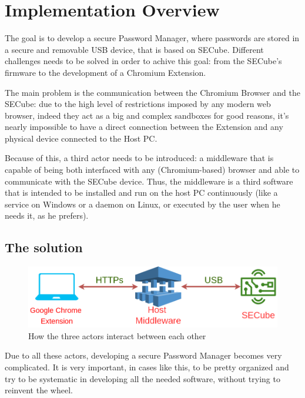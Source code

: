 \chapter{Implementation Overview}
\label{sec:implementation-overview}

The goal is to develop a secure Password Manager, where passwords are stored in a secure and removable USB device, that is based on SECube. Different challenges needs to be solved in order to achive this goal: from the SECube's firmware to the development of a Chromium Extension. \bigskip

The main problem is the communication between the Chromium Browser and the SECube: due to the high level of restrictions imposed by any modern web browser, indeed they act as a big and complex sandboxes for good reasons, it's nearly impossible to have a direct connection between the Extension and any physical device connected to the Host PC. \bigskip

Because of this, a third actor needs to be introduced: a middleware that is capable of being both interfaced with any (Chromium-based) browser and able to communicate with the SECube device. Thus, the middleware is a third software that is intended to be installed and run on the host PC continuously (like a service on Windows or a daemon on Linux, or executed by the user when he needs it, as he prefers). \bigskip

\section{The solution}

\begin{figure}[H]
	\centering
	\includegraphics[width=0.9\linewidth]{images/overview}
	\caption{How the three actors interact between each other}
	\label{fig:overview}
\end{figure}

Due to all these actors, developing a secure Password Manager becomes very complicated. It is very important, in cases like this, to be pretty organized and try to be systematic in developing all the needed software, without trying to reinvent the wheel. \bigskip

